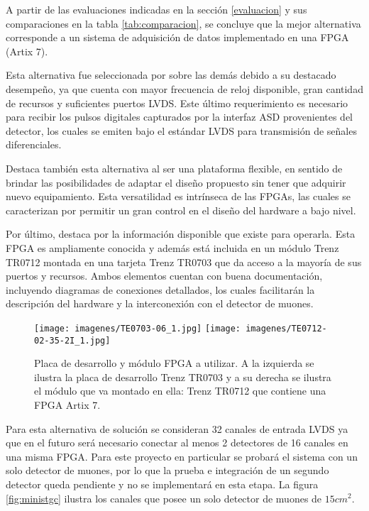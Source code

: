\par A partir de las evaluaciones indicadas en la sección \ref{evaluacion} y sus comparaciones en la tabla \ref{tab:comparacion}, se concluye que la mejor alternativa corresponde a un sistema de adquisición de datos implementado en una FPGA (Artix 7\cite{Xilinx20107DS180}).
\par Esta alternativa fue seleccionada por sobre las demás debido a su destacado desempeño, ya que cuenta con mayor frecuencia de reloj disponible, gran cantidad de recursos y suficientes puertos LVDS. Este último requerimiento es necesario para recibir los pulsos digitales capturados por la interfaz ASD\cite{1999ATLASICs} provenientes del detector, los cuales se emiten bajo el estándar LVDS para transmisión de señales diferenciales.
\par Destaca también esta alternativa al ser una plataforma flexible, en sentido de brindar las posibilidades de adaptar el diseño propuesto sin tener que adquirir nuevo equipamiento. Esta versatilidad es intrínseca de las FPGAs, las cuales se caracterizan por permitir un gran control en el diseño del hardware a bajo nivel.
\par Por último, destaca por la información disponible que existe para operarla. Esta FPGA es ampliamente conocida y además está incluida en un módulo Trenz TR0712\cite{TrenzElectronic2019TR07012Wiki} montada en una tarjeta Trenz TR0703\cite{TrenzElectronic2019TR0703Wiki} que da acceso a la mayoría de sus puertos y recursos. Ambos elementos cuentan con buena documentación, incluyendo diagramas de conexiones detallados, los cuales facilitarán la descripción del hardware y la interconexión con el detector de muones.

\begin{figure}[H]
	\centering
	\texttt{[image: imagenes/TE0703-06\_1.jpg]}
	\texttt{[image: imagenes/TE0712-02-35-2I\_1.jpg]}
	\caption{Placa de desarrollo y módulo FPGA a utilizar. A la izquierda se ilustra la placa de desarrollo Trenz TR0703\cite{TrenzElectronic2019TR0703Wiki} y a su derecha se ilustra el módulo que va montado en ella: Trenz TR0712\cite{TrenzElectronic2019TR07012Wiki} que contiene una FPGA Artix 7\cite{Xilinx20107DS180}.}
	\label{fig:trenz}
\end{figure}


\par Para esta alternativa de solución se consideran 32 canales de entrada LVDS ya que en el futuro será necesario conectar al menos 2 detectores de 16 canales en una misma FPGA. Para este proyecto en particular se probará el sistema con un solo detector de muones, por lo que la prueba e integración de un segundo detector queda pendiente y no se implementará en esta etapa. La figura \ref{fig:ministgc} ilustra los canales que posee un solo detector de muones de $15cm^2$.

